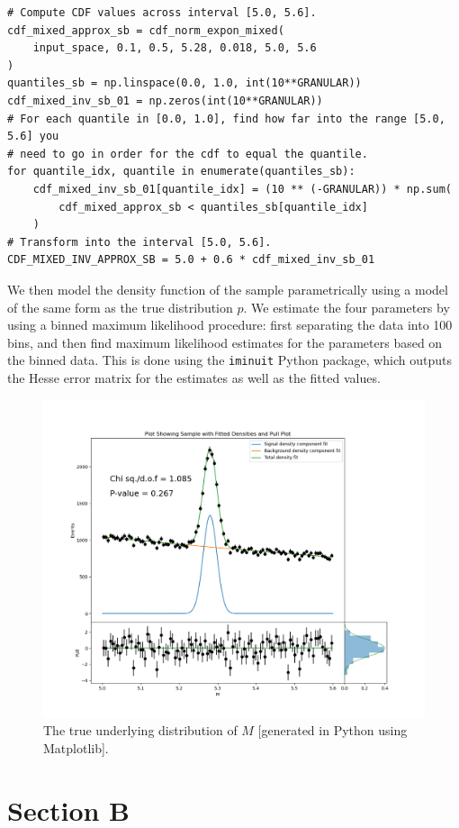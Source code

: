 \documentclass[12pt]{article}
\begin{document}
\begin{lstlisting}[caption=Code block producing array of values for inverse CDF of $p$ (e).]
# Compute CDF values across interval [5.0, 5.6].
cdf_mixed_approx_sb = cdf_norm_expon_mixed(
    input_space, 0.1, 0.5, 5.28, 0.018, 5.0, 5.6
)
quantiles_sb = np.linspace(0.0, 1.0, int(10**GRANULAR))
cdf_mixed_inv_sb_01 = np.zeros(int(10**GRANULAR))
# For each quantile in [0.0, 1.0], find how far into the range [5.0, 5.6] you
# need to go in order for the cdf to equal the quantile.
for quantile_idx, quantile in enumerate(quantiles_sb):
    cdf_mixed_inv_sb_01[quantile_idx] = (10 ** (-GRANULAR)) * np.sum(
        cdf_mixed_approx_sb < quantiles_sb[quantile_idx]
    )
# Transform into the interval [5.0, 5.6].
CDF_MIXED_INV_APPROX_SB = 5.0 + 0.6 * cdf_mixed_inv_sb_01
\end{lstlisting}

We then model the density function of the sample parametrically using a model of the same form as the true distribution $p$.
We estimate the four parameters by using a binned maximum likelihood procedure: first separating the data into 100 bins, and then find maximum likelihood estimates for the parameters based on the binned data.
This is done using the \texttt{iminuit} Python package, which outputs the Hesse error matrix for the estimates as well as the fitted values.

\begin{figure}[hbt]
    \includegraphics[scale=0.4]{part_e_plot.png}
    \caption{The true underlying distribution of $M$ [generated in Python using Matplotlib].}
    \label{parte}
\end{figure}

\section*{Section B}
\end{document}
